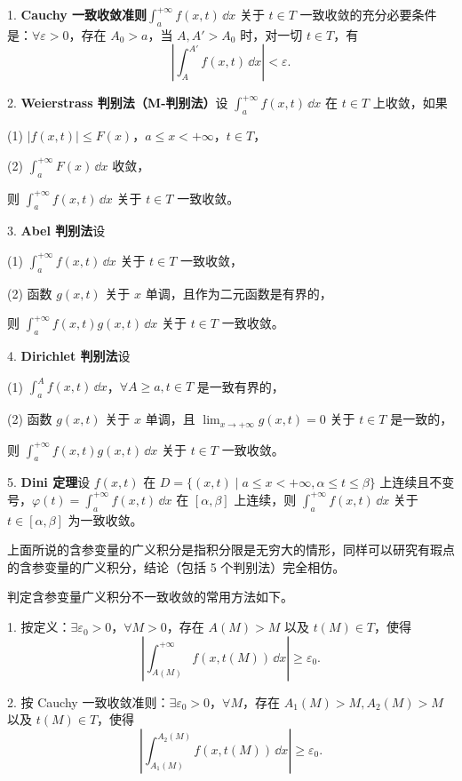 1. \textbf{Cauchy 一致收敛准则}\quad $\displaystyle\int_a^{+\infty}f(x,t)\,\dd x$ 关于 $t\in T$ 一致收敛的充分必要条件是：$\forall\varepsilon>0$，存在 $A_0>a$，当 $A,A'>A_0$ 时，对一切 $t\in T$，有
\[
  \left|\int_A^{A'}f(x,t)\,\dd x\right|<\varepsilon.
\]

2. \textbf{Weierstrass 判别法（M-判别法）}\quad 设 $\displaystyle\int_a^{+\infty}f(x,t)\,\dd x$ 在 $t\in T$ 上收敛，如果

(1) $|f(x,t)|\leqslant F(x)$，$a\leqslant x<+\infty$，$t\in T$，

(2) $\displaystyle\int_a^{+\infty}F(x)\,\dd x$ 收敛，

则 $\displaystyle\int_a^{+\infty}f(x,t)\,\dd x$ 关于 $t\in T$ 一致收敛。

3. \textbf{Abel 判别法}\quad 设

(1) $\displaystyle\int_a^{+\infty}f(x,t)\,\dd x$ 关于 $t\in T$ 一致收敛，

(2) 函数 $g(x,t)$ 关于 $x$ 单调，且作为二元函数是有界的，

则 $\displaystyle\int_a^{+\infty}f(x,t)g(x,t)\,\dd x$ 关于 $t\in T$ 一致收敛。

4. \textbf{Dirichlet 判别法}\quad 设

(1) $\displaystyle\int_a^A f(x,t)\,\dd x$，$\forall A\geqslant a,t\in T$ 是一致有界的，

(2) 函数 $g(x,t)$ 关于 $x$ 单调，且 $\displaystyle\lim_{x\to+\infty}g(x,t)=0$ 关于 $t\in T$ 是一致的，

则 $\displaystyle\int_a^{+\infty}f(x,t)g(x,t)\,\dd x$ 关于 $t\in T$ 一致收敛。

5. \textbf{Dini 定理}\quad 设 $f(x,t)$ 在 $D=\{(x,t)\mid a\leqslant x<+\infty,\alpha\leqslant t\leqslant\beta\}$ 上连续且不变号，$\varphi(t)=\displaystyle\int_a^{+\infty}f(x,t)\,\dd x$ 在 $[\alpha,\beta]$ 上连续，则 $\displaystyle\int_a^{+\infty}f(x,t)\,\dd x$ 关于 $t\in[\alpha,\beta]$ 为一致收敛。

上面所说的含参变量的广义积分是指积分限是无穷大的情形，同样可以研究有瑕点的含参变量的广义积分，结论（包括 5 个判别法）完全相仿。

判定含参变量广义积分不一致收敛的常用方法如下。

1. 按定义：$\exists\varepsilon_0>0$，$\forall M>0$，存在 $A(M)>M$ 以及 $t(M)\in T$，使得
\[
  \left|\int_{A(M)}^{+\infty}f(x,t(M))\,\dd x\right|\geqslant\varepsilon_0.
\]

2. 按 Cauchy 一致收敛准则：$\exists\varepsilon_0>0$，$\forall M$，存在 $A_1(M)>M,A_2(M)>M$ 以及 $t(M)\in T$，使得
\[
  \left|\int_{A_1(M)}^{A_2(M)}f(x,t(M))\,\dd x\right|\geqslant\varepsilon_0.
\]

